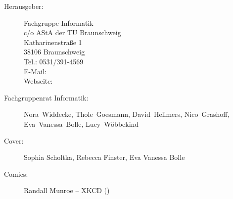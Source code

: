 
\begin{description}
\item[Herausgeber:]
	Fachgruppe Informatik\\
	c/o AStA der TU Braunschweig\\
	Katharinenstraße 1\\
	38106 Braunschweig\\
	Tel.: 0531/391-4569\\
	E-Mail: \\
	Webseite: \fginfoUrl
\item[Fachgruppenrat Informatik:] Nora~Widdecke, Thole~Goesmann, David~Hellmers, Nico~Grashoff, Eva~Vanessa~Bolle, Lucy~Wöbbekind 
\item[Cover:] Sophia Scholtka, Rebecca Finster, Eva Vanessa Bolle

\item[Comics:] Randall Munroe -- XKCD ()
\end{description}
